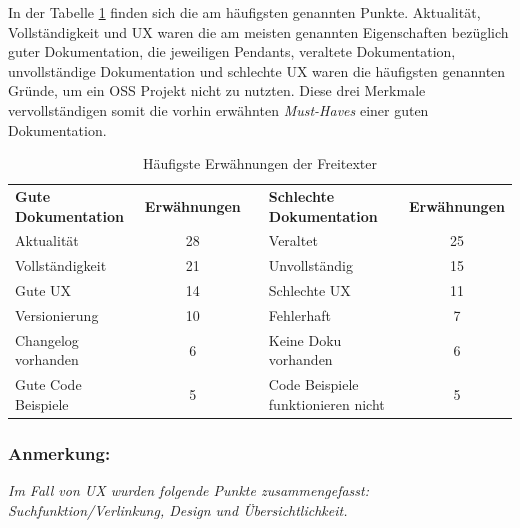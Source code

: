 In der Tabelle \ref{tab:freitext_felder_ergebnisse} finden sich die am häufigsten genannten
Punkte. Aktualität, Vollständigkeit und UX waren die am meisten genannten Eigenschaften
bezüglich guter Dokumentation, die jeweiligen Pendants, veraltete Dokumentation, unvollständige
Dokumentation und schlechte UX waren die häufigsten genannten Gründe, um ein OSS Projekt nicht zu
nutzten. Diese drei Merkmale vervollständigen somit die vorhin erwähnten \textit{Must-Haves} einer
guten Dokumentation.

\bigskip
\begin{table}[h]
    \begin{tabular}{lcllc}
        \cline{1-2} \cline{4-5}
        \textbf{Gute Dokumentation} & \multicolumn{1}{l}{\textbf{Erwähnungen}} & \hspace{1cm} & \textbf{Schlechte Dokumentation}   & \multicolumn{1}{l}{\textbf{Erwähnungen}} \\ \cline{1-2} \cline{4-5}
        Aktualität                  & 28                                       &              & Veraltet                           & 25                                       \\
        Vollständigkeit             & 21                                       &              & Unvollständig                      & 15                                       \\
        Gute UX                     & 14                                       &              & Schlechte UX                       & 11                                       \\
        Versionierung               & 10                                       &              & Fehlerhaft                         & 7                                        \\
        Changelog vorhanden         & 6                                        &              & Keine Doku vorhanden               & 6                                        \\
        Gute Code Beispiele         & 5                                        &              & Code Beispiele funktionieren nicht & 5
    \end{tabular}%
    \caption{Häufigste Erwähnungen der Freitexter}
    \label{tab:freitext_felder_ergebnisse}
\end{table}


\subsubsection*{Anmerkung:}
\textit{Im Fall von UX wurden folgende Punkte zusammengefasst: Suchfunktion/Verlinkung, Design und
Übersichtlichkeit.}


